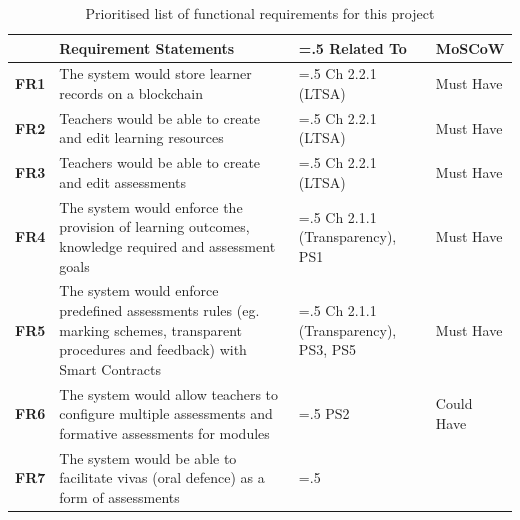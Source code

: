 \begin{table}[!h]
	\caption{Prioritised list of functional requirements for this project}
	\centering
	\label{table:fx-reqs}
	\begin{tabularx}{\textwidth}{>{\bfseries}l>{\hsize=1.5\hsize}X>{\hsize=.5\hsize}Xl}
		                                                          & Requirement Statements                                                            & Related To  & MoSCoW \\
		\toprule
		FR1                                                       & The system would store learner records on a blockchain
		                                                          & Ch 2.2.1 (LTSA)                                                                   & Must Have
		\\\midrule
		FR2                                                       & Teachers would be able to create and edit learning resources
		                                                          & Ch 2.2.1 (LTSA)                                                                   & Must Have
		\\\midrule
		FR3                                                       & Teachers would be able to create and edit assessments
		                                                          & Ch 2.2.1 (LTSA)                                                                   & Must Have
		\\\midrule
		FR4                                                       & The system would enforce the provision of learning outcomes, knowledge required
		and assessment goals & Ch 2.1.1 (Transparency),
		PS1                                                       & Must Have
		\\\midrule
		FR5                                                       & The system would enforce predefined assessments rules (eg. marking schemes,
		transparent procedures and feedback) with Smart Contracts
		                                                          & Ch 2.1.1 (Transparency), PS3, PS5                                                 & Must Have
		\\\midrule
		FR6                                                       & The system would allow teachers to configure multiple assessments and
		formative assessments for modules                         & PS2                                                                               & Could Have
		\\\midrule
		FR7                                                       & The system would be able to facilitate vivas (oral defence) as a form of assessments         &

\end{tabularx}
\end{table}
